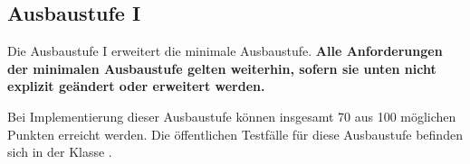 \subsection{Ausbaustufe I}
\label{sec:ausbau1}

Die Ausbaustufe I erweitert die minimale Ausbaustufe. \textbf{Alle
  Anforderungen der minimalen Ausbaustufe gelten weiterhin, sofern sie
  unten nicht explizit ge\"andert oder erweitert werden.}

Bei Implementierung dieser Ausbaustufe k\"onnen insgesamt 70 aus 100
m\"oglichen Punkten erreicht werden. Die \"offentlichen Testf\"alle
f\"ur diese Ausbaustufe befinden sich in der Klasse \texttt{\testLvA}.
